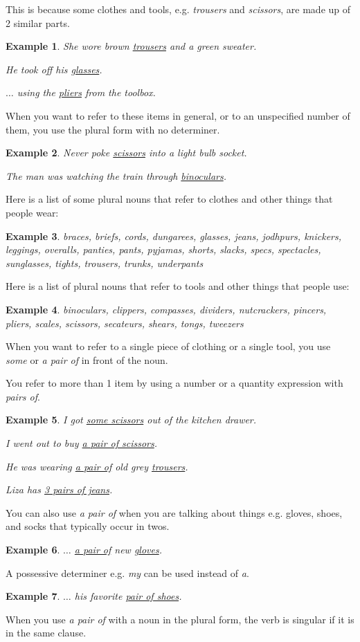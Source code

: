 \documentclass[oneside]{book}
\numberwithin{equation}{section}
\newtheorem{example}{Example}[section]
\begin{document}
%
This is because some clothes and tools, e.g. \textit{trousers} and \textit{scissors}, are made up of 2 similar parts.
\begin{example}
    She wore brown \underline{trousers} and a green sweater.
    
    He took off his \underline{glasses}.
    
    $\ldots$ using the \underline{pliers} from the toolbox.
\end{example}
When you want to refer to these items in general, or to an unspecified number of them, you use the plural form with no determiner.
\begin{example}
    Never poke \underline{scissors} into a light bulb socket.
    
    The man was watching the train through \underline{binoculars}.
\end{example}
Here is a list of some plural nouns that refer to clothes and other things that people wear:
\begin{example}
    braces, briefs, cords, dungarees, glasses, jeans, jodhpurs, knickers, leggings, overalls, panties, pants, pyjamas, shorts, slacks, specs, spectacles, sunglasses, tights, trousers, trunks, underpants
\end{example}
Here is a list of plural nouns that refer to tools and other things that people use:
\begin{example}
    binoculars, clippers, compasses, dividers, nutcrackers, pincers, pliers, scales, scissors, secateurs, shears, tongs, tweezers
\end{example}
When you want to refer to a single piece of clothing or a single tool, you use \textit{some} or \textit{a pair of} in front of the noun.

You refer to more than 1 item by using a number or a quantity expression with \textit{pairs of}.
\begin{example}
    I got \underline{some scissors} out of the kitchen drawer.
    
    I went out to buy \underline{a pair of scissors}.
    
    He was wearing \underline{a pair of} old grey \underline{trousers}.
    
    Liza has \underline{3 pairs of jeans}.
\end{example}
You can also use \textit{a pair of} when you are talking about things e.g. gloves, shoes, and socks that typically occur in twos.
\begin{example}
    $\ldots$ \underline{a pair of} new \underline{gloves}.
\end{example} 
A possessive determiner e.g. \textit{my} can be used instead of \textit{a}.
\begin{example}
    $\ldots$ his favorite \underline{pair of shoes}.
\end{example}
When you use \textit{a pair of} with a noun in the plural form, the verb is singular if it is in the same clause.
\end{document}
